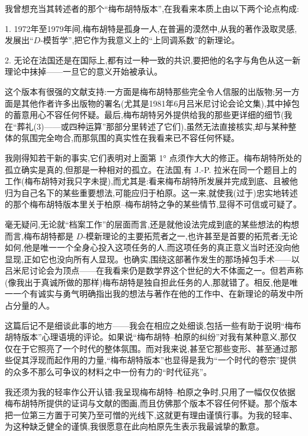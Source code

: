我曾想充当其转述者的那个“梅布胡特版本”,在我看来本质上由以下两个论点构成:

1. 1972年至1979年间,梅布胡特是孤身一人,在普遍的漠然中,从我的著作汲取灵感,发展出“$D$-模哲学”,把它作为我意义上的“上同调系数”的新理论。

2. 无论在法国还是在国际上,都有过一种一致的共识,要把他的名字与角色从这一新理论中抹掉——一旦它的意义开始被承认。

这个版本有很强的文献支持:一方面是梅布胡特那些完全令人信服的出版物;另一方面是其他作者许多出版物的署名(尤其是1981年6月吕米尼讨论会论文集),其中掉包的蓄意用心不容任何怀疑。最后,梅布胡特另外提供给我的那些更详细的细节(我在“葬礼(3)——或四种运算”那部分里转述了它们),虽然无法直接核实,却与某种整体的氛围完全吻合,而那氛围的真实性在我看来已不容任何怀疑。

我刚得知若干新的事实,它们表明对上面第 1° 点须作大大的修正。梅布胡特所处的孤立确实是真的,但那是一种相对的孤立。在法国,有 J.-P. 拉米在同一个题目上的工作(梅布胡特对我只字未提),而尤其是:看来梅布胡特所发展并完成到底、且被他归为自己名下的某些重要想法,可能应归于柏原。这一来,就使我(过于)忠实地转述的那个梅布胡特版本里关于柏原–梅布胡特之争的某些情节,显得不可信或可疑了。

毫无疑问,无论就“档案工作”的层面而言,还是就他设法完成到底的某些想法的构想而言,梅布胡特都是 $D$-模新理论的主要拓荒者之一,也许甚至是首要的拓荒者;无论如何,他是唯一一个全身心投入这项任务的人,而这项任务的真正意义当时还没向他显现,正如它也没向所有人显现。也确实,围绕这部著作发生的那场掉包手术——以吕米尼讨论会为顶点——在我看来仍是数学界这个世纪的大不体面之一。但若声称(像我出于真诚所做的那样)梅布胡特是独自担此任务的人,那就错了。相反,他是唯一一个有诚实与勇气明确指出我的想法与著作在他的工作中、在新理论的萌发中所占分量的人。

这篇后记不是细谈此事的地方——我会在相应之处细谈,包括一些有助于说明“梅布胡特版本”心理语境的评论。如果说“梅布胡特–柏原的纠纷”对我有某种意义,那仅仅在于它照亮了一个时代的整体氛围。而对我来说,甚至它那些变形、甚至通过那些促其浮现而起作用的力量,“梅布胡特版本”也显得是我为“一个时代的卷宗”提供的众多不那么可争议的材料之中一份有力的“时代征兆”。

我还须为我的轻率作公开认错:我呈现梅布胡特–柏原之争时,只用了一幅仅仅依据梅布胡特所提供的证词与文献的图画,而且仿佛那个版本不容任何怀疑。那个版本把一位第三方置于可笑乃至可憎的光线下,这就更有理由谨慎行事。为我的轻率、为这种缺乏健全的谨慎,我很愿意在此向柏原先生表示我最诚挚的歉意。
